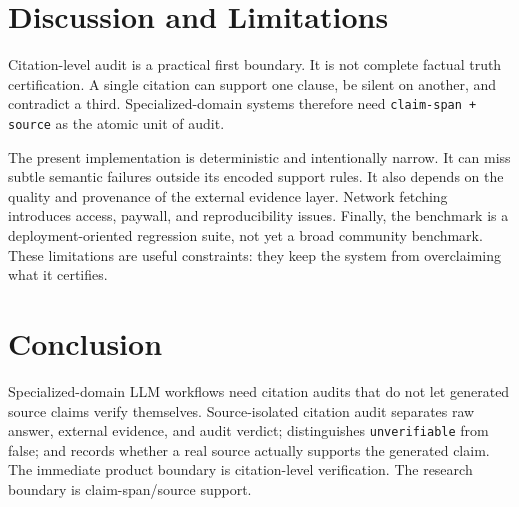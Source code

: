 \documentclass[11pt]{article}
\begin{document}
\section{Discussion and Limitations}

Citation-level audit is a practical first boundary. It is not complete factual truth certification. A single citation can support one clause, be silent on another, and contradict a third. Specialized-domain systems therefore need \texttt{claim-span + source} as the atomic unit of audit.

The present implementation is deterministic and intentionally narrow. It can miss subtle semantic failures outside its encoded support rules. It also depends on the quality and provenance of the external evidence layer. Network fetching introduces access, paywall, and reproducibility issues. Finally, the benchmark is a deployment-oriented regression suite, not yet a broad community benchmark. These limitations are useful constraints: they keep the system from overclaiming what it certifies.

\section{Conclusion}

Specialized-domain LLM workflows need citation audits that do not let generated source claims verify themselves. Source-isolated citation audit separates raw answer, external evidence, and audit verdict; distinguishes \texttt{unverifiable} from false; and records whether a real source actually supports the generated claim. The immediate product boundary is citation-level verification. The research boundary is claim-span/source support.


\end{document}
